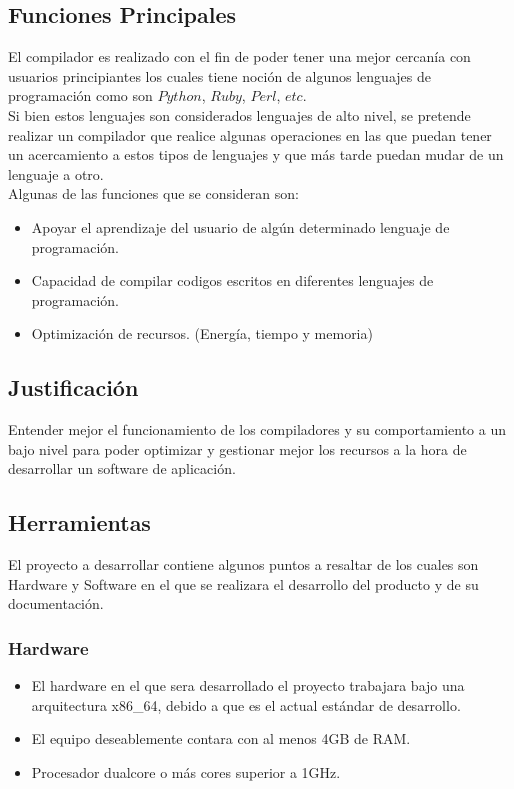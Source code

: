 \documentclass[10pt,executivepaper]{article}
\begin{document}
\subsection{Funciones Principales}
El compilador es realizado con el fin de poder tener una mejor cercanía con usuarios principiantes los cuales tiene noción de algunos lenguajes de programación como son $Python$, $Ruby$, $Perl$, $etc$.\\Si bien estos lenguajes son considerados lenguajes de alto nivel, se pretende realizar un compilador que realice algunas  operaciones en las que puedan tener un acercamiento a estos tipos de lenguajes y que más tarde puedan mudar de un lenguaje a otro.\\Algunas de las funciones que se consideran son:
\begin{itemize}
    \item Apoyar el aprendizaje del usuario de algún determinado lenguaje de programación.
    \item Capacidad de compilar codigos escritos en diferentes lenguajes de programación. 
    \item Optimización de recursos. (Energía, tiempo y memoria)
\end{itemize}
\subsection{Justificación}
Entender mejor el funcionamiento de los compiladores y su comportamiento a un bajo nivel para poder optimizar y gestionar mejor los recursos a la hora de desarrollar un software de aplicación.
\subsection{Herramientas}
El proyecto a desarrollar contiene algunos puntos a resaltar de los cuales son Hardware y Software en el que se realizara el desarrollo del producto y de su documentación.
\subsubsection{Hardware}
\begin{itemize}
  \item El hardware en el que sera desarrollado el proyecto trabajara bajo una arquitectura x86\_64, debido a que es el actual estándar de desarrollo.
  \item El equipo deseablemente contara con al menos 4GB de RAM.
  \item Procesador dualcore o más cores superior a 1GHz.
\end{itemize}
\end{document}

